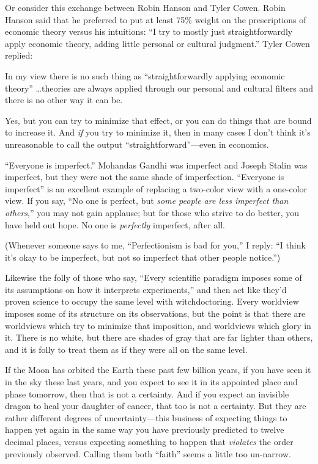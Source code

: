 {
 Or consider this exchange between Robin Hanson and Tyler Cowen.
Robin Hanson said that he preferred to put at least 75\% weight on the
prescriptions of economic theory versus his intuitions:
``I try to mostly just straightforwardly apply
economic theory, adding little personal or cultural
judgment.'' Tyler Cowen replied:}

{
 In my view there is no such thing as
``straightforwardly applying economic
theory'' \ldots theories are always applied through
our personal and cultural filters and there is no other way it can be.}

{
 Yes, but you can try to minimize that effect, or you can do things
that are bound to increase it. And \textit{if} you try to minimize it,
then in many cases I don't think it's
unreasonable to call the output
``straightforward''---even in
economics.}

{
 ``Everyone is imperfect.''
Mohandas Gandhi was imperfect and Joseph Stalin was imperfect, but they
were not the same shade of imperfection. ``Everyone is
imperfect'' is an excellent example of replacing a
two-color view with a one-color view. If you say, ``No
one is perfect, but \textit{some people are less imperfect than
others},'' you may not gain applause; but for those
who strive to do better, you have held out hope. No one is
\textit{perfectly} imperfect, after all.}

{
 (Whenever someone says to me, ``Perfectionism is
bad for you,'' I reply: ``I think
it's okay to be imperfect, but not so imperfect that
other people notice.'')}

{
 Likewise the folly of those who say, ``Every
scientific paradigm imposes some of its assumptions on how it
interprets experiments,'' and then act like
they'd proven science to occupy the same level with
witchdoctoring. Every worldview imposes some of its structure on its
observations, but the point is that there are worldviews which try to
minimize that imposition, and worldviews which glory in it. There is no
white, but there are shades of gray that are far lighter than others,
and it is folly to treat them as if they were all on the same level.}

{
 If the Moon has orbited the Earth these past few billion years, if
you have seen it in the sky these last years, and you expect to see it
in its appointed place and phase tomorrow, then that is not a
certainty. And if you expect an invisible dragon to heal your daughter
of cancer, that too is not a certainty. But they are rather different
degrees of uncertainty---this business of expecting things to happen
yet again in the same way you have previously predicted to twelve
decimal places, versus expecting something to happen that
\textit{violates} the order previously observed. Calling them both
``faith'' seems a little too
un-narrow.}

